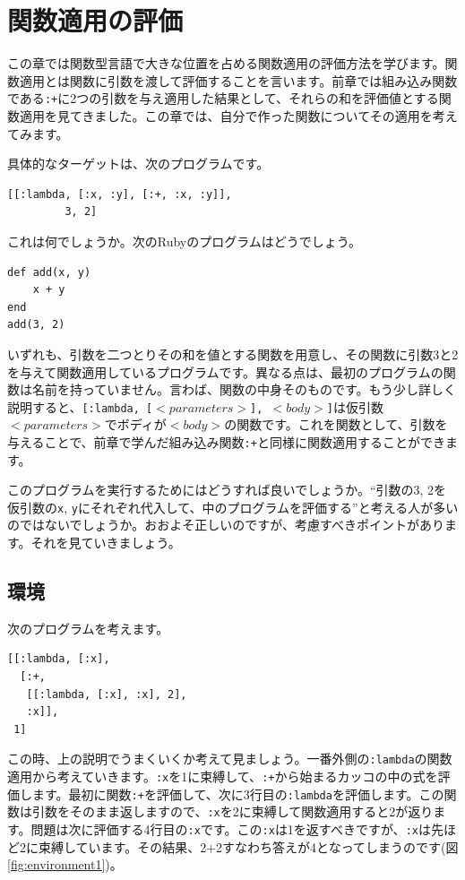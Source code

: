 \chapter{関数適用の評価\hspace{-3mm}}

この章では関数型言語で大きな位置を占める関数適用の評価方法を学びます。関数適用とは関数に引数を渡して評価することを言います。前章では組み込み関数である{\tt :+}に2つの引数を与え適用した結果として、それらの和を評価値とする関数適用を見てきました。この章では、自分で作った関数についてその適用を考えてみます。

具体的なターゲットは、次のプログラムです。

\begin{lstlisting}
[[:lambda, [:x, :y], [:+, :x, :y]],
         3, 2]
\end{lstlisting}

これは何でしょうか。次のRubyのプログラムはどうでしょう。
\begin{lstlisting}
def add(x, y)
    x + y
end
add(3, 2)
\end{lstlisting}
いずれも、引数を二つとりその和を値とする関数を用意し、その関数に引数3と2を与えて関数適用しているプログラムです。異なる点は、最初のプログラムの関数は名前を持っていません。言わば、関数の中身そのものです。もう少し詳しく説明すると、{\tt [:lambda, [$<parameters>$], $<body>$]}は仮引数{\tt $<parameters>$}でボディが{\tt $<body>$}の関数です。これを関数として、引数を与えることで、前章で学んだ組み込み関数{\tt :+}と同様に関数適用することができます。

このプログラムを実行するためにはどうすれば良いでしょうか。“引数の3, 2を仮引数の{\tt x}, {\tt y}にそれぞれ代入して、中のプログラムを評価する”と考える人が多いのではないでしょうか。おおよそ正しいのですが、考慮すべきポイントがあります。それを見ていきましょう。


\section{環境}
次のプログラムを考えます。

\begin{lstlisting}
[[:lambda, [:x],
  [:+, 
   [[:lambda, [:x], :x], 2],
   :x]], 
 1]
\end{lstlisting}

この時、上の説明でうまくいくか考えて見ましょう。一番外側の{\tt :lambda}の関数適用から考えていきます。{\tt :x}を1に束縛して、{\tt :+}から始まるカッコの中の式を評価します。最初に関数{\tt :+}を評価して、次に3行目の{\tt :lambda}を評価します。この関数は引数をそのまま返しますので、{\tt :x}を2に束縛して関数適用すると2が返ります。問題は次に評価する4行目の{\tt :x}です。この{\tt :x}は1を返すべきですが、{\tt :x}は先ほど2に束縛しています。その結果、2+2すなわち答えが4となってしまうのです(図 \ref{fig:environment1})。

